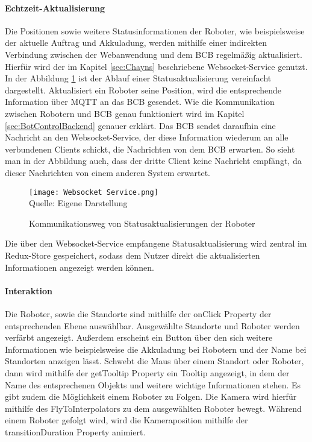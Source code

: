 \paragraph{Echtzeit-Aktualisierung}
Die Positionen sowie weitere Statusinformationen der Roboter, wie beispielsweise der aktuelle Auftrag und Akkuladung, werden mithilfe einer indirekten Verbindung zwischen der Webanwendung und dem \ac{BCB} regelmäßig aktualisiert. Hierfür wird der im Kapitel \ref{sec:Chayns} beschriebene \gls{Websocket}-Service genutzt. In der Abbildung \ref{fig:RobotStatusUpdate} ist der Ablauf einer Statusaktualisierung vereinfacht dargestellt. Aktualisiert ein Roboter seine Position, wird die entsprechende Information über \gls{MQTT} an das \ac{BCB} gesendet. Wie die Kommunikation zwischen Robotern und \ac{BCB} genau funktioniert wird im Kapitel \ref{sec:BotControlBackend} genauer erklärt.
Das \ac{BCB} sendet daraufhin eine Nachricht an den \gls{Websocket}-Service, der diese Information wiederum an alle verbundenen Clients schickt, die Nachrichten von dem \ac{BCB} erwarten. So sieht man in der Abbildung auch, dass der dritte Client keine Nachricht empfängt, da dieser Nachrichten von einem anderen System erwartet.

\begin{figure}[H]
    \centering
    \caption[]{Kommunikationsweg von Statusaktualisierungen der Roboter}\label{fig:RobotStatusUpdate}
    \texttt{[image: Websocket Service.png]}
    \\
    Quelle: Eigene Darstellung
\end{figure}

Die über den \gls{Websocket}-Service empfangene Statusaktualisierung wird zentral im Redux-Store gespeichert, sodass dem Nutzer direkt die aktualisierten Informationen angezeigt werden können.

\paragraph{Interaktion}
Die Roboter, sowie die Standorte sind mithilfe der onClick Property der entsprechenden Ebene \cite{DeckglInteractivity} auswählbar. Ausgewählte Standorte und Roboter werden verfärbt angezeigt. Außerdem erscheint ein Button über den sich weitere Informationen wie beispielsweise die Akkuladung bei Robotern und der Name bei Standorten anzeigen lässt. Schwebt die Maus über einem Standort oder Roboter, dann wird mithilfe der getTooltip Property \cite{DeckglDeckClass} ein Tooltip angezeigt, in dem der Name des entsprechenen Objekts und weitere wichtige Informationen stehen. Es gibt zudem die Möglichkeit einem Roboter zu Folgen. Die Kamera wird hierfür mithilfe des FlyToInterpolators \cite{DeckglFlyToInterpolator} zu dem ausgewählten Roboter bewegt. Während einem Roboter gefolgt wird, wird die Kameraposition mithilfe der transitionDuration Property \cite{DeckglAnimationsAndTransitions} animiert.

